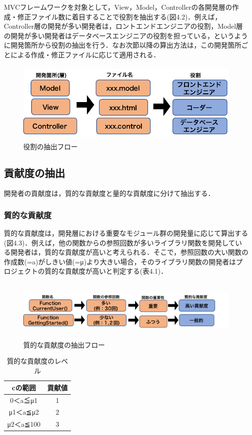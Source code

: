 \documentclass{funthesis}
\begin{document}
MVCフレームワークを対象として，View，Model，Controllerの各開発層の作成・修正ファイル数に着目することで役割を抽出する(図4.2)．例えば，Controller層の開発が多い開発者は，ロントエンドエンジニアの役割，Model層の開発が多い開発者はデータベースエンジニアの役割を担っている，というように開発箇所から役割の抽出を行う．なお次節以降の算出方法は，この開発箇所ごとによる作成・修正ファイルに応じて適用される．
\begin{figure}[H]
\centering  %
\includegraphics[clip,width=12cm,height=4cm]{figures/role.pdf}
  \caption{役割の抽出フロー}    \label{sample}
\end{figure}

\subsection{貢献度の抽出}

開発者の貢献度は，質的な貢献度と量的な貢献度に分けて抽出する．
\subsubsection{質的な貢献度}
質的な貢献度は，開発層における重要なモジュール群の開発量に応じて算出する(図4.3)．例えば，他の関数からの参照回数が多いライブラリ関数を開発している開発者は，質的な貢献度が高いと考えられる．そこで，参照回数の大い関数の作成数(=a)がしきい値(=μ)より大きい場合，そのライブラリ関数の開発者はプロジェクトの質的な貢献度が高いと判定する(表4.1)．

\begin{figure}[H]
\centering  %
\includegraphics[clip,width=16cm,height=3cm]{figures/contribution_quality.pdf}
  \caption{質的な貢献度の抽出フロー}    \label{sample}
\end{figure}
\begin{table}[H]
  \begin{center}
    \begin{tabular}{|c||c|} \hline
      cの範囲 & 貢献値  \\ \hline
      0＜a≦μ1 & 1 \\ \hline
      μ1＜a≦μ2 & 2 \\ \hline
      μ2＜a≦100 & 3  \\ \hline
    \end{tabular}
  \end{center}
  \caption{質的な貢献度のレベル}    \label{sample}
\end{table}
\end{document}
